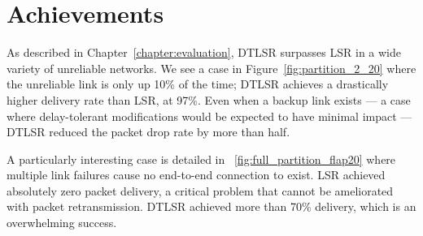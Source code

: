 \documentclass[withindex,glossary,openany]{cam-thesis}
\begin{document}
\section{Achievements}

As described in Chapter~\ref{chapter:evaluation}, DTLSR surpasses LSR in a wide variety of unreliable networks. We see a case in Figure~\ref{fig:partition_2_20} where the unreliable link is only up 10\% of the time; DTLSR achieves a drastically higher delivery rate than LSR, at 97\%. Even when a backup link exists --- a case where delay-tolerant modifications would be expected to have minimal impact --- DTLSR reduced the packet drop rate by more than half.

A particularly interesting case is detailed in ~\ref{fig:full_partition_flap20} where multiple link failures cause no end-to-end connection to exist. LSR achieved absolutely zero packet delivery, a critical problem that cannot be ameliorated with packet retransmission. DTLSR achieved more than 70\% delivery, which is an overwhelming success.
\end{document}
